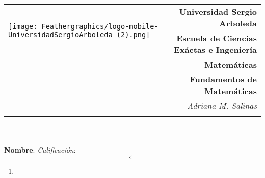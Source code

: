 \documentclass[12pt,letterpaper]{exam}
\newcommand{\base}[1]{\underline{\hspace{#1}}}
\newcommand{\uni}{Universidad Sergio Arboleda}
\newcommand{\fac}{\normalsize{Escuela de Ciencias Exáctas e Ingeniería}}
\newcommand{\dep}{Matemáticas}
\newcommand{\mat}{Fundamentos de  Matem\'aticas} %
\newcommand{\tema}{} %
\newcommand{\autor}{Adriana M. Salinas}
\begin{document}
\begin{tabular}{lr}
    \multirow{2}{*}{\texttt{[image: Feathergraphics/logo-mobile-UniversidadSergioArboleda (2).png]}}
    	& {\textbf{\uni}} \\	
    	& {\textbf{\fac}} \\
    	& {\textbf{\dep}} \\
    	& {\textbf{\mat \tema}} \\
    	& {\textit{\autor}}\\
		& {\textit{}}
\end{tabular}\\
\base{19.5cm}\\
\textbf{Nombre}: \base{13.2cm}  \textit{Calificación}: \base{2cm} \\

\begin{equation}
    \Longleftarrow
\end{equation}

\begin{multicols}{2}
   \begin{enumerate}
       \item 







       
   \end{enumerate}
\end{multicols}
\end{document}
